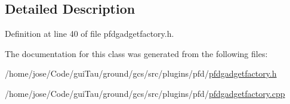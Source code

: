 \subsection{Detailed Description}


Definition at line 40 of file pfdgadgetfactory.\-h.



The documentation for this class was generated from the following files\-:\begin{DoxyCompactItemize}
\item 
/home/jose/\-Code/gui\-Tau/ground/gcs/src/plugins/pfd/\hyperlink{pfdgadgetfactory_8h}{pfdgadgetfactory.\-h}\item 
/home/jose/\-Code/gui\-Tau/ground/gcs/src/plugins/pfd/\hyperlink{pfdgadgetfactory_8cpp}{pfdgadgetfactory.\-cpp}\end{DoxyCompactItemize}
